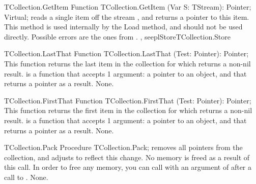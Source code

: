 \html{}

\begin{function}{TCollection.GetItem}
\Declaration
Function TCollection.GetItem (Var S: TStream): Pointer; Virtual;
\Description
{} reads a single item off the stream , and
returns a pointer to this item. This method is used internally by the Load
method, and should not be used directly.
\Errors
Possible errors are the ones from .
\SeeAlso
{}, seepl{Store}{TCollection.Store}
\end{function}

\begin{function}{TCollection.LastThat}
\Declaration
Function TCollection.LastThat (Test: Pointer): Pointer;
\Description
This function returns the last item in the collection for which 
returns a non-nil result.  is a function that accepts 1 argument:
a pointer to an object, and that returns a pointer as a result.
\Errors
None.
\SeeAlso
{}
\end{function}

\html{}

\begin{function}{TCollection.FirstThat}
\Declaration
Function TCollection.FirstThat (Test: Pointer): Pointer;
\Description
This function returns the first item in the collection for which 
returns a non-nil result.  is a function that accepts 1 argument:
a pointer to an object, and that returns a pointer as a result.
\Errors
None.
\SeeAlso
{}
\end{function}

\html{}

\begin{procedure}{TCollection.Pack}
\Declaration
Procedure TCollection.Pack;
\Description
{} removes all  pointers from the collection, and adjusts
 to reflect this change. No memory is freed as a result of this
call. In order to free any memory, you can call  with an
argument of  after a call to .
\Errors
None.
\SeeAlso
{}
\end{procedure}

\html{}

